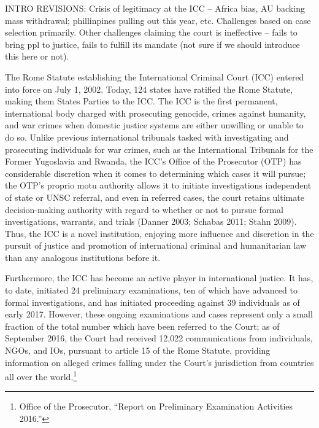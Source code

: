 INTRO REVISIONS:  Crisis of legitimacy at the ICC – Africa bias, AU backing mass withdrawal; phillinpines pulling out this year, etc.  Challenges based on case selection primarily.  Other challenges claiming the court is ineffective – fails to bring ppl to justice, fails to fulfill its mandate (not sure if we should introduce this here or not).

The Rome Statute establishing the International Criminal Court (ICC) entered into force on July 1, 2002. Today, 124 states have ratified the Rome Statute, making them States Parties to the ICC. The ICC is the first permanent, international body charged with prosecuting genocide, crimes against humanity, and war crimes when domestic justice systems are either unwilling or unable to do so. Unlike previous international tribunals tasked with investigating and prosecuting individuals for war crimes, such as the International Tribunals for the Former Yugoslavia and Rwanda, the ICC’s Office of the Prosecutor (OTP) has considerable discretion when it comes to determining which cases it will pursue; the OTP’s proprio motu authority allows it to initiate investigations independent of state or UNSC referral, and even in referred cases, the court retains ultimate decision-making authority with regard to whether or not to pursue formal investigations, warrants, and trials (Danner 2003; Schabas 2011; Stahn 2009). Thus, the ICC is a novel institution, enjoying more influence and discretion in the pursuit of justice and promotion of international criminal and humanitarian law than any analogous institutions before it.

Furthermore, the ICC has become an active player in international justice. It has, to date, initiated 24 preliminary examinations, ten of which have advanced to formal investigations, and has initiated proceeding against 39 individuals as of early 2017. However, these ongoing examinations and cases represent only a small fraction of the total number which have been referred to the Court; as of September 2016, the Court had received 12,022 communications from individuals, NGOs, and IOs, pursuant to article 15 of the Rome Statute, providing information on alleged crimes falling under the Court’s jurisdiction from countries all over the world.\footnote{Office of the Prosecutor, ``Report on Preliminary Examination Activities 2016.''} 

